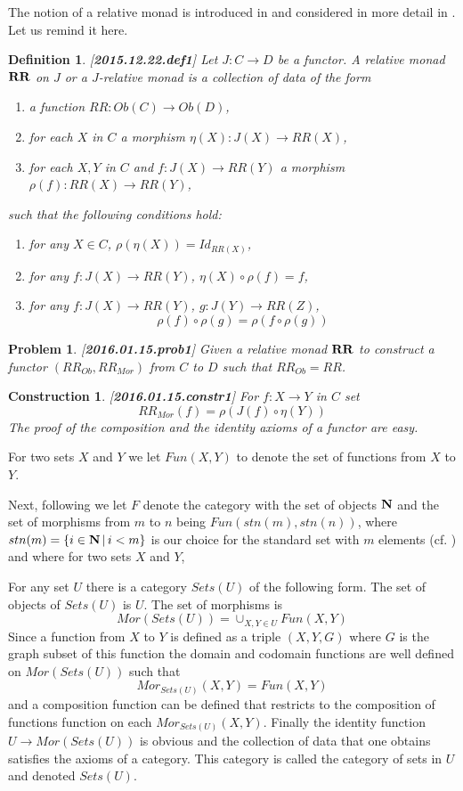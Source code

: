 \documentclass[11pt]{article}
\newtheorem{definition}[proposition]{Definition}
\newtheorem{problem}[proposition]{Problem}
\newtheorem{construction}[proposition]{Construction}
\newcommand{\llabel}[1]{\label{#1}[{\bf #1}]}
\newcommand{\sr}{\rightarrow}
\newcommand{\nn}{{\bf N\rm}}
\newcommand{\nat}{\nn}
\newcommand{\mbind}{\rho}
\newcommand{\RR}{{\bf RR}}
\begin{document}
The notion of a relative monad is introduced in \cite[Def.1, p. 299]{ACU} and considered in more detail in \cite{ACU2}. Let us remind it here.
%
%
\begin{definition}
\llabel{2015.12.22.def1}
Let $J:C\sr D$ be a functor. A relative monad $\RR$ on $J$ or a $J$-relative monad is a collection of data of the form
%
\begin{enumerate}
\item a function $RR:Ob(C)\sr Ob(D)$,
\item for each $X$ in $C$ a morphism $\eta(X):J(X)\sr RR(X)$,
\item for each  $X,Y$ in $C$ and $f:J(X)\sr RR(Y)$ a morphism $\mbind(f):RR(X)\sr RR(Y)$,
\end{enumerate}
%
such that the following conditions hold:
%
\begin{enumerate}
\item for any $X\in C$, $\mbind(\eta(X))=Id_{RR(X)}$,
\item for any $f:J(X)\sr RR(Y)$, $\eta(X)\circ \mbind(f)=f$,
\item for any $f:J(X)\sr RR(Y)$, $g:J(Y)\sr RR(Z)$, 
%
$$\mbind(f)\circ \mbind(g)=\mbind(f\circ \mbind(g))$$
%
\end{enumerate}
\end{definition}
%
\begin{problem}\llabel{2016.01.15.prob1}
Given a relative monad $\RR$ to construct a functor $(RR_{Ob},RR_{Mor})$ from $C$ to $D$ such that $RR_{Ob}=RR$.
\end{problem}
%
\begin{construction}\rm\llabel{2016.01.15.constr1}
For $f:X\sr Y$ in $C$ set
%
$$RR_{Mor}(f)=\mbind(J(f)\circ \eta(Y))$$
%
The proof of the composition and the identity axioms of a functor are easy.
\end{construction}
%
For two sets $X$ and $Y$ we let $Fun(X,Y)$ to denote the set of functions from $X$ to $Y$. 

Next, following \cite{FPT} we let $F$ denote the category with the set of objects $\nat$ and the set of morphisms from $m$ to $n$ being $Fun(stn(m),stn(n))$, where $stn(m)=\{i\in\nat\,|\,i<m\}$ is our choice for the standard set with $m$ elements (cf. \cite{LandC}) and where for two sets $X$ and $Y$, 

For any set $U$ there is a category $Sets(U)$ of the following form. The set of objects of $Sets(U)$ is $U$. The set of morphisms is
%
$$Mor(Sets(U))=\cup_{X,Y\in U}Fun(X,Y)$$
%
Since a function from $X$ to $Y$ is defined as a triple $(X,Y,G)$ where $G$ is the graph subset of this function the domain and codomain functions are well defined on $Mor(Sets(U))$ such that
%
$$Mor_{Sets(U)}(X,Y)=Fun(X,Y)$$
%
and a composition function can be defined that restricts to the composition of functions function on each $Mor_{Sets(U)}(X,Y)$. Finally the identity function $U\sr Mor(Sets(U))$ is obvious and the collection of data that one obtains satisfies the axioms of a category. This category is called the category of sets in $U$ and denoted $Sets(U)$. 
\end{document}
